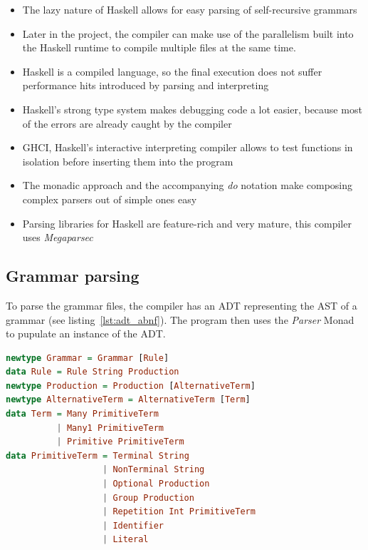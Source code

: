 \begin{itemize}

\item{The lazy nature of Haskell allows for easy parsing of self-recursive grammars}
\item{Later in the project, the compiler can make use of the parallelism built into the Haskell runtime to compile multiple files at the same time.}
\item{Haskell is a compiled language, so the final execution does not suffer performance hits introduced by parsing and interpreting}
\item{Haskell's strong type system makes debugging code a lot easier, because most of the errors are already caught by the compiler}
\item{GHCI, Haskell's interactive interpreting compiler allows to test functions in isolation before inserting them into the program}
\item{The monadic approach and the accompanying \textit{do} notation make composing complex parsers out of simple ones easy}
\item{Parsing libraries for Haskell are feature-rich and very mature, this compiler uses \textit{Megaparsec}}

\end{itemize}

\subsection{Grammar parsing}

To parse the grammar files, the compiler has an ADT representing the AST of a grammar (see listing~\ref{lst:adt_abnf}). The program then uses the \textit{Parser} Monad to pupulate an instance of the ADT.

\begin{lstlisting}[linewidth=\columnwidth, caption={ADT of ABNF grammar}, captionpos=b, label=lst:adt_abnf, language=Haskell]
newtype Grammar = Grammar [Rule]
data Rule = Rule String Production
newtype Production = Production [AlternativeTerm]
newtype AlternativeTerm = AlternativeTerm [Term]
data Term = Many PrimitiveTerm
          | Many1 PrimitiveTerm
          | Primitive PrimitiveTerm
data PrimitiveTerm = Terminal String
                   | NonTerminal String
                   | Optional Production
                   | Group Production
                   | Repetition Int PrimitiveTerm
                   | Identifier
                   | Literal
\end{lstlisting}

